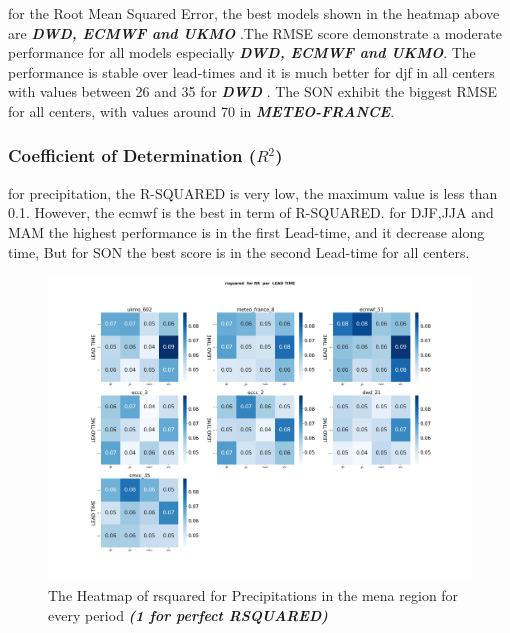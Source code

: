 for the Root Mean Squared Error, the best models shown in the heatmap above are \textbf{\textit{DWD, ECMWF and UKMO}} .The RMSE score demonstrate a moderate performance for all models especially \textbf{\textit{DWD, ECMWF and UKMO}}. The performance is stable over lead-times and it is much better for djf in all centers with values between 26 and 35 for \textbf{\textit{DWD}} . The SON exhibit the biggest RMSE for all centers, with values around 70 in \textbf{\textit{METEO-FRANCE}}.

\subsubsection{Coefficient of Determination (\( R^2 \))}
for precipitation, the R-SQUARED is very low, the maximum value is less than 0.1. However, the ecmwf is the best in term of R-SQUARED. for DJF,JJA and MAM the highest performance is in the first Lead-time, and it decrease along time, But for SON the best score is in the second Lead-time for all centers.
\begin{figure}[H]
	\centering
	\includegraphics[scale=0.25]{plots/det/rsquared/rsquared_RR_mena.png}
	\caption{The Heatmap of rsquared for Precipitations in the mena region for every period \textbf{\textit{(1 for perfect RSQUARED)} }}
\end{figure}



